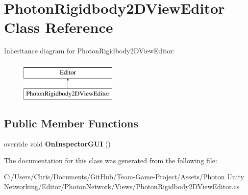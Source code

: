 \hypertarget{class_photon_rigidbody2_d_view_editor}{}\section{Photon\+Rigidbody2\+D\+View\+Editor Class Reference}
\label{class_photon_rigidbody2_d_view_editor}
Inheritance diagram for Photon\+Rigidbody2\+D\+View\+Editor\+:\begin{figure}[H]
\begin{center}
\leavevmode
\includegraphics[height=2.000000cm]{class_photon_rigidbody2_d_view_editor}
\end{center}
\end{figure}
\subsection*{Public Member Functions}
\begin{DoxyCompactItemize}
\item 
override void {\bfseries On\+Inspector\+G\+UI} ()\hypertarget{class_photon_rigidbody2_d_view_editor_a1a5ec67e72c24325621732f9ffc6e753}{}\label{class_photon_rigidbody2_d_view_editor_a1a5ec67e72c24325621732f9ffc6e753}

\end{DoxyCompactItemize}


The documentation for this class was generated from the following file\+:\begin{DoxyCompactItemize}
\item 
C\+:/\+Users/\+Chris/\+Documents/\+Git\+Hub/\+Team-\/\+Game-\/\+Project/\+Assets/\+Photon Unity Networking/\+Editor/\+Photon\+Network/\+Views/Photon\+Rigidbody2\+D\+View\+Editor.\+cs\end{DoxyCompactItemize}
